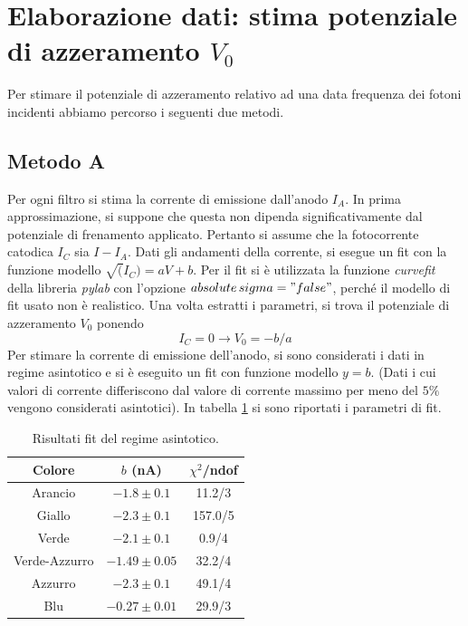 \documentclass[10pt,a4paper]{article}
\begin{document}
\section{Elaborazione dati: stima potenziale di azzeramento $V_0$}
Per stimare il potenziale di azzeramento relativo ad una data frequenza dei fotoni incidenti abbiamo percorso i seguenti due metodi.
\subsection{Metodo A}
Per ogni filtro si stima la corrente di emissione dall'anodo $I_A$. In prima approssimazione, si suppone che questa non dipenda significativamente dal potenziale di frenamento applicato. Pertanto si assume che la fotocorrente catodica $I_{C}$ sia $I-I_A$. 
Dati gli andamenti della corrente, si esegue un fit con la funzione modello $\sqrt(I_C)=aV +b$. Per il fit si è utilizzata la funzione \emph{curvefit} della libreria \emph{pylab} con l'opzione \emph{$absolute\,sigma = "false"$}, perché il modello di fit usato non è realistico.
Una volta estratti i parametri, si trova il potenziale di azzeramento $V_0$ ponendo 
\begin{equation}\label{eq:v0parabola}
I_{C}=0\rightarrow V_0=-b/a
\end{equation}
Per stimare la corrente di emissione dell'anodo, si sono considerati i dati in regime asintotico e si è eseguito un fit con funzione modello $y = b$.
(Dati i cui valori di corrente differiscono dal valore di corrente massimo per meno del $5\%$ vengono considerati asintotici).
In tabella \ref{tab:asintotico} si sono riportati i parametri di fit.

\begin{table}[!htb]
\centering
\begin{tabular}{|c|c|c|}
\hline
Colore & $b$ (nA) & $\chi ^2 $/ndof\\
\hline
Arancio & $-1.8\pm0.1$ & 11.2/3\\
\hline
Giallo & $-2.3\pm 0.1$ & 157.0/5\\
\hline
Verde & $-2.1\pm 0.1$ & 0.9/4\\
\hline
Verde-Azzurro & $-1.49\pm 0.05$ & 32.2/4\\
\hline
Azzurro & $-2.3 \pm 0.1$ & 49.1/4\\
\hline
Blu & $-0.27\pm0.01$ & 29.9/3\\
\hline
\end{tabular}
\caption{Risultati fit del regime asintotico.\label{tab:asintotico}}
\end{table}
\end{document}

